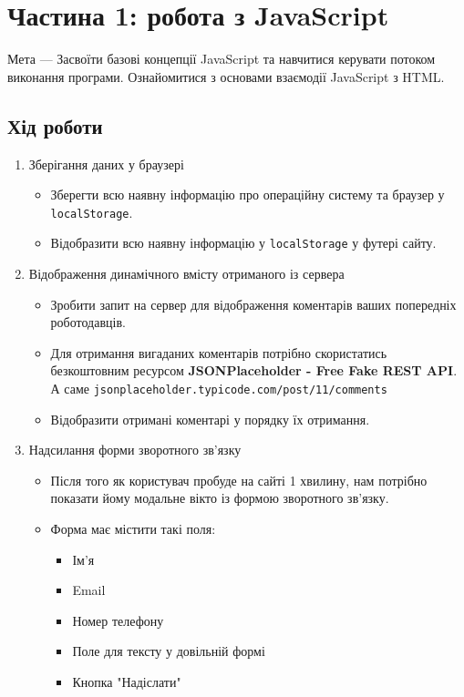 \documentclass[12pt, a4paper]{article}
\begin{document}

\section{Частина 1: робота з JavaScript}
Мета --- Засвоїти базові концепції JavaScript та навчитися керувати потоком виконання програми. Ознайомитися з основами взаємодії JavaScript з HTML.
\subsection{Хід роботи}
\begin{enumerate}
	\item Зберігання даних у браузері
		\begin{itemize}
			\item Зберегти всю наявну інформацію про операційну систему та браузер у \verb|localStorage|.
			\item Відобразити всю наявну інформацію у \verb|localStorage| у футері сайту.
		\end{itemize}
	\item Відображення динамічного вмісту отриманого із сервера
		\begin{itemize}
			\item Зробити запит на сервер для відображення коментарів ваших попередніх роботодавців.
			\item Для отримання вигаданих коментарів потрібно скористатись безкоштовним ресурсом \textbf{JSONPlaceholder - Free Fake REST API}. А саме \verb|jsonplaceholder.typicode.com/post/11/comments| 
			\item Відобразити отримані коментарі у порядку їх отримання.
		\end{itemize}
	\item Надсилання форми зворотного зв'язку
		\begin{itemize}
			\item Після того як користувач пробуде на сайті 1 хвилину, нам потрібно показати йому модальне вікто із формою зворотного зв'язку.
			\item Форма має містити такі поля:
				\begin{itemize}
					\item Ім'я
					\item Email
					\item Номер телефону
					\item Поле для тексту у довільній формі
					\item Кнопка "Надіслати"
				\end{itemize}

\end{itemize}
\end{enumerate}
\end{document}
